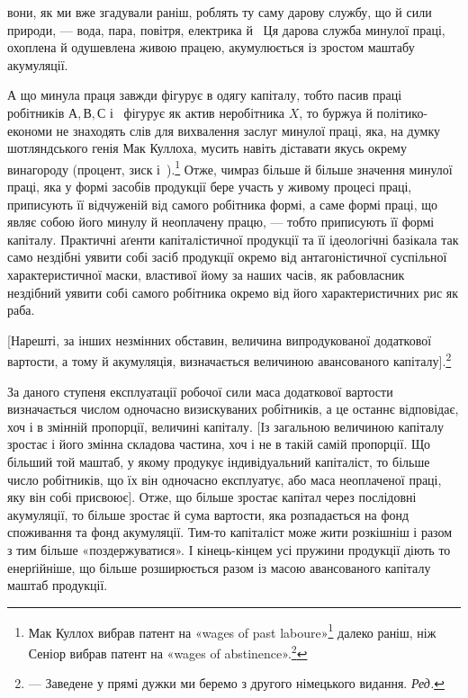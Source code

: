\parcont{}  %
вони, як ми вже згадували раніш, роблять ту саму дарову службу,
що й сили природи, — вода, пара, повітря, електрика й~
Ця дарова служба минулої праці, охоплена й одушевлена живою
працею, акумулюється із зростом маштабу акумуляції.

А що минула праця завжди фігурує в одягу капіталу, тобто
пасив праці робітників $А, В, С$ і~ фігурує як актив неробітника
$X$, то буржуа й політико-економи не знаходять слів
для вихвалення заслуг минулої праці, яка, на думку шотляндського
генія Мак Куллоха, мусить навіть діставати якусь окрему
винагороду (процент, зиск і~).\footnote{
Мак Куллох вибрав патент на «wages of past laboure»\footnote*{
— винагороду за минулу працю. \emph{Ред.}
} далеко раніш, ніж Сеніор вибрав патент на «wages of abstinence».\footnote*{
— винагороду за поздержливість. \emph{Ред.}
}
} Отже, чимраз більше й
більше значення минулої праці, яка у формі засобів продукції
бере участь у живому процесі праці, приписують її відчуженій
від самого робітника формі, а саме формі праці, що являє собою
його минулу й неоплачену працю, — тобто приписують її
формі капіталу. Практичні аґенти капіталістичної продукції
та її ідеологічні базікала так само нездібні уявити собі засіб
продукції окремо від антагоністичної суспільної характеристичної
маски, властивої йому за наших часів, як рабовласник
нездібний уявити собі самого робітника окремо від його характеристичних
рис як раба.

[Нарешті, за інших незмінних обставин, величина випродукованої
додаткової вартости, а тому й акумуляція, визначається
величиною авансованого капіталу].\footnote*{— Заведене у прямі дужки ми беремо з другого німецького видання.
\emph{Ред.}}

За даного ступеня експлуатації робочої сили маса додаткової
вартости визначається числом одночасно визискуваних робітників,
а це останнє відповідає, хоч і в змінній пропорції, величині
капіталу. [Із загальною величиною капіталу зростає і його
змінна складова частина, хоч і не в такій самій пропорції. Що
більший той маштаб, у якому продукує індивідуальний капіталіст,
то більше число робітників, що їх він одночасно експлуатує,
або маса неоплаченої праці, яку він собі присвоює]. Отже,
що більше зростає капітал через послідовні акумуляції, то більше
зростає й сума вартости, яка розпадається на фонд споживання
та фонд акумуляції. Тим-то капіталіст може жити розкішніш
і разом з тим більше «поздержуватися». І кінець-кінцем усі
пружини продукції діють то енерґійніше, що більше розширюється
разом із масою авансованого капіталу маштаб продукції.
